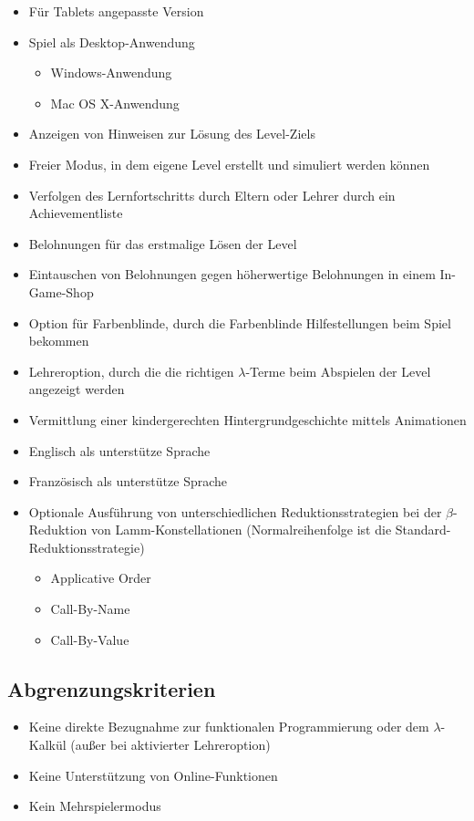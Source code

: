 \begin{itemize}
	\item Für Tablets angepasste Version
	\item Spiel als Desktop-Anwendung
	\begin{itemize}
		\item Windows-Anwendung
		\item Mac OS X-Anwendung
	\end{itemize}
	\item Anzeigen von Hinweisen zur Lösung des Level-Ziels
	\item Freier Modus, in dem eigene Level erstellt und simuliert werden können
	\item Verfolgen des Lernfortschritts durch Eltern oder Lehrer durch ein Achievementliste
	\item Belohnungen für das erstmalige Lösen der Level
	\item Eintauschen von Belohnungen gegen höherwertige Belohnungen in einem In-Game-Shop
	\item Option für Farbenblinde, durch die Farbenblinde Hilfestellungen beim Spiel bekommen
	\item Lehreroption, durch die die richtigen $\lambda$-Terme beim Abspielen der Level angezeigt werden
	\item Vermittlung einer kindergerechten Hintergrundgeschichte mittels Animationen
	\item Englisch als unterstütze Sprache
	\item Französisch als unterstütze Sprache
	\item Optionale Ausführung von unterschiedlichen Reduktionsstrategien bei der $\beta$-Reduktion von Lamm-Konstellationen (Normalreihenfolge ist die Standard-Reduktionsstrategie)
	\begin{itemize}
		\item Applicative Order
		\item Call-By-Name
		\item Call-By-Value
	\end{itemize}
		
\end{itemize}

\subsection{Abgrenzungskriterien}

\begin{itemize}
	\item Keine direkte Bezugnahme zur funktionalen Programmierung oder dem $\lambda$-Kalkül (außer bei aktivierter Lehreroption) 
	\item Keine Unterstützung von Online-Funktionen
	\item Kein Mehrspielermodus
\end{itemize}
